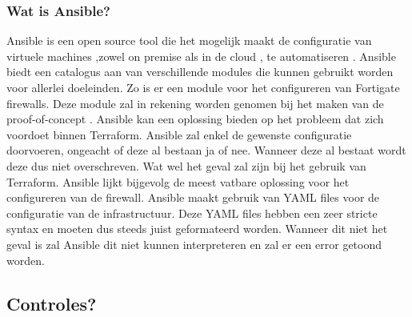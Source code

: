\subsubsection{Wat is Ansible?}
\label{sec:Wat is ansible}
Ansible is een open source tool die het mogelijk maakt de configuratie van virtuele machines ,zowel on premise als in de cloud , te automatiseren \autocite{Hat}. Ansible biedt een catalogus aan van verschillende modules die kunnen gebruikt worden voor allerlei doeleinden. Zo is er een module voor het configureren van Fortigate firewalls. Deze module zal in rekening worden genomen bij het maken van de proof-of-concept \autocite{Fortinet2020}. Ansible kan een oplossing bieden op het probleem dat zich voordoet binnen Terraform. Ansible zal enkel de gewenste configuratie doorvoeren, ongeacht of deze al bestaan ja of nee. Wanneer deze al bestaat wordt deze dus niet overschreven. Wat wel het geval zal zijn bij het gebruik van Terraform. Ansible lijkt bijgevolg de meest vatbare oplossing voor het configureren van de firewall. Ansible maakt gebruik van YAML files voor de configuratie van de infrastructuur. Deze YAML files hebben een zeer stricte syntax en moeten dus steeds juist geformateerd worden. Wanneer dit niet het geval is zal Ansible dit niet kunnen interpreteren en zal er een error getoond worden.

\subsection{Controles?}

